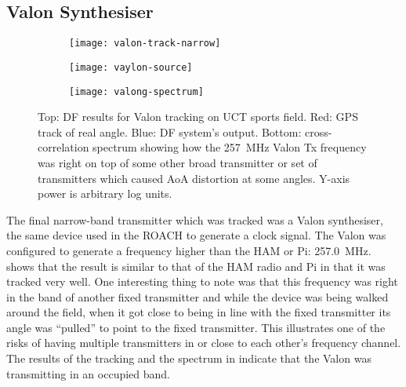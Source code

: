 \subsection{Valon Synthesiser}
\begin{figure}
  \centering
  \vspace{4em}
  \begin{subfigure}[b]{0.77\textwidth}
    \centering
    \texttt{[image: valon-track-narrow]}
  \end{subfigure}
  \begin{subfigure}[b]{0.22\textwidth}
    \centering
    \texttt{[image: vaylon-source]}
    \vspace{2em}
  \end{subfigure}
  \vspace{4em}
  \begin{subfigure}[b]{\textwidth}
    \centering
    \texttt{[image: valong-spectrum]}
  \end{subfigure}
  \caption{Top: DF results for Valon tracking on UCT sports field. Red: GPS track of real angle. Blue: DF system's output. Bottom: cross-correlation spectrum showing how the \SI{257}{\mega\hertz} Valon Tx frequency was right on top of some other broad transmitter or set of transmitters which caused AoA distortion at some angles. Y-axis power is arbitrary log units.}
  \label{fig:field-trials:valon-source}
\end{figure}

The final narrow-band transmitter which was tracked was a Valon synthesiser, the same device used in the ROACH to generate a clock signal. The Valon was configured to generate a frequency higher than the HAM or Pi: \SI{257.0}{\mega\hertz}.  shows that the result is similar to that of the HAM radio and Pi in that it was tracked very well. One interesting thing to note was that this frequency was right in the band of another fixed transmitter and while the device was being walked around the field, when it got close to being in line with the fixed transmitter its angle was ``pulled'' to point to the fixed transmitter. This illustrates one of the risks of having multiple transmitters in or close to each other's frequency channel. The results of the tracking and the spectrum in  indicate that the Valon was transmitting in an occupied band.

